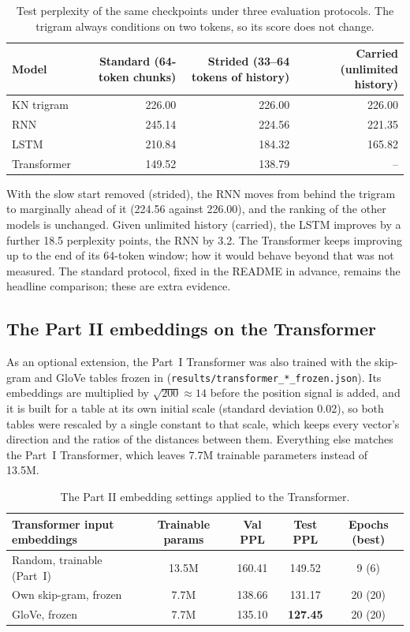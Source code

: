 \documentclass[10pt]{article}
\newcommand{\tok}[1]{\texttt{#1}}
\begin{document}
\begin{table}[h]
\centering\small
\begin{tabular}{lrrr}
\toprule
Model & Standard (64-token chunks) & Strided (33--64 tokens of history) & Carried (unlimited history) \\
\midrule
KN trigram & 226.00 & 226.00 & 226.00 \\
RNN & 245.14 & 224.56 & 221.35 \\
LSTM & 210.84 & 184.32 & 165.82 \\
Transformer & 149.52 & 138.79 & -- \\
\bottomrule
\end{tabular}
\caption{Test perplexity of the same checkpoints under three evaluation protocols. The trigram always conditions on two tokens, so its score does not change.}
\label{tab:context}
\end{table}

With the slow start removed (strided), the RNN moves from behind the trigram to marginally ahead of it (224.56 against 226.00), and the ranking of the other models is unchanged. Given unlimited history (carried), the LSTM improves by a further 18.5 perplexity points, the RNN by 3.2. The Transformer keeps improving up to the end of its 64-token window; how it would behave beyond that was not measured. The standard protocol, fixed in the README in advance, remains the headline comparison; these are extra evidence.

\subsection{The Part II embeddings on the Transformer}\label{app:transformer}
As an optional extension, the Part~I Transformer was also trained with the skip-gram and GloVe tables frozen in (\tok{results/transformer\_*\_frozen.json}). Its embeddings are multiplied by $\sqrt{200} \approx 14$ before the position signal is added, and it is built for a table at its own initial scale (standard deviation 0.02), so both tables were rescaled by a single constant to that scale, which keeps every vector's direction and the ratios of the distances between them. Everything else matches the Part~I Transformer, which leaves 7.7M trainable parameters instead of 13.5M.

\begin{table}[h]
\centering\small
\begin{tabular}{lcccc}
\toprule
Transformer input embeddings & Trainable params & Val PPL & Test PPL & Epochs (best) \\
\midrule
Random, trainable (Part~I) & 13.5M & 160.41 & 149.52 & 9 (6) \\
Own skip-gram, frozen & 7.7M & 138.66 & 131.17 & 20 (20) \\
GloVe, frozen & 7.7M & 135.10 & \textbf{127.45} & 20 (20) \\
\bottomrule
\end{tabular}
\caption{The Part II embedding settings applied to the Transformer.}
\label{tab:part2transformer}
\end{table}
\end{document}
